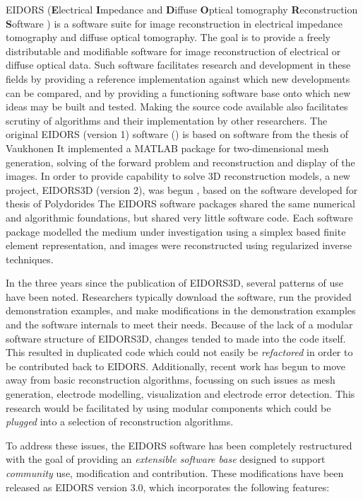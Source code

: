 \documentclass[12pt]{iopart}
\begin{document}
EIDORS
({\bf E}lectrical
 {\bf I}mpedance and
 {\bf D}iffuse
 {\bf O}ptical tomography
 {\bf R}econstruction
 {\bf S}oftware )
is a software suite for image reconstruction in
electrical impedance tomography and diffuse optical tomography.
The goal is to provide a freely distributable and modifiable
software for image reconstruction of electrical 
or diffuse optical data. Such software facilitates research
and development
in these fields by providing a reference implementation
against which new developments can be compared, and by
providing a functioning software base onto which new
ideas may be built and tested.
Making the source code available also facilitates scrutiny
of algorithms and their implementation by other researchers.
The original EIDORS (version 1) software (\cite{Vauhkonen_etal_2000})
is based on software from the thesis of Vaukhonen \cite{Vauhkonen_1997}
It implemented a MATLAB package for two-dimensional mesh generation,
solving of the forward
problem and reconstruction and display of the images.
In order to provide capability to solve 3D reconstruction models,
a new project, EIDORS3D (version 2), was begun \cite{Polydorides_and_Lionheart_2002},
based on the software developed for thesis of Polydorides \cite{Polydorides_2002}
The EIDORS software packages shared the same numerical
and algorithmic foundations, but shared very little software code.
Each software package modelled the medium under investigation
using a simplex based finite element representation,
and images were reconstructed using regularized inverse techniques.

In the three years since the publication of EIDORS3D, several patterns
of use have been noted. Researchers typically download the software,
run the provided demonstration examples,  and 
make modifications in the demonstration examples and the software
internals to meet their needs.
Because of the lack of a modular software structure of EIDORS3D,
changes tended to made into the code itself. This resulted in
duplicated
code which could not easily be {\em refactored} in order to
be contributed back to EIDORS. Additionally, recent work has begun to move
away from basic reconstruction algorithms, focussing
on such issues as mesh generation, electrode modelling, visualization
and electrode error detection. This research would be facilitated
by using modular components which could be {\em plugged} into
a selection of reconstruction algorithms.

To address these issues, the EIDORS software has been completely
restructured with the goal of providing an {\em extensible software base}
designed to support {\em community} use, modification and contribution.
These modifications have been released as EIDORS version 3.0,
which incorporates the following features:
\end{document}
